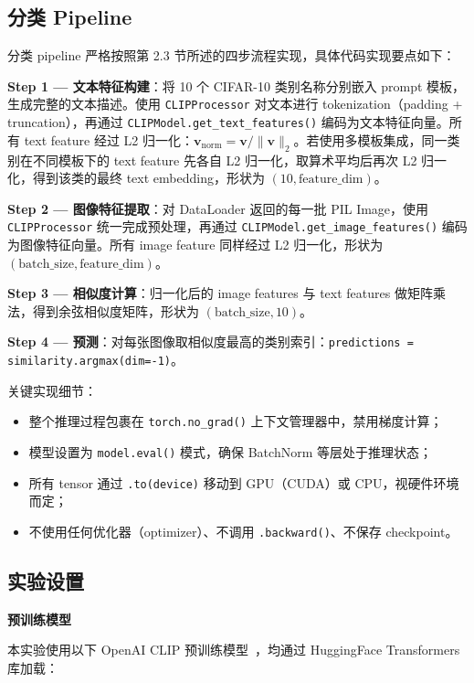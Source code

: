 \documentclass[12pt,a4paper]{ctexart}
\begin{document}
\subsection{分类 Pipeline}

分类 pipeline 严格按照第 2.3 节所述的四步流程实现，具体代码实现要点如下：

\textbf{Step 1 — 文本特征构建}：将 10 个 CIFAR-10 类别名称分别嵌入 prompt 模板，生成完整的文本描述。使用 \texttt{CLIPProcessor} 对文本进行 tokenization（padding + truncation），再通过 \texttt{CLIPModel.get\_text\_features()} 编码为文本特征向量。所有 text feature 经过 L2 归一化：$\mathbf{v}_{\text{norm}} = \mathbf{v} / \|\mathbf{v}\|_2$。若使用多模板集成，同一类别在不同模板下的 text feature 先各自 L2 归一化，取算术平均后再次 L2 归一化，得到该类的最终 text embedding，形状为 $(10, \text{feature\_dim})$。

\textbf{Step 2 — 图像特征提取}：对 DataLoader 返回的每一批 PIL Image，使用 \texttt{CLIPProcessor} 统一完成预处理，再通过 \texttt{CLIPModel.get\_image\_features()} 编码为图像特征向量。所有 image feature 同样经过 L2 归一化，形状为 $(\text{batch\_size}, \text{feature\_dim})$。

\textbf{Step 3 — 相似度计算}：归一化后的 image features 与 text features 做矩阵乘法，得到余弦相似度矩阵，形状为 $(\text{batch\_size}, 10)$。

\textbf{Step 4 — 预测}：对每张图像取相似度最高的类别索引：\texttt{predictions = similarity.argmax(dim=-1)}。

关键实现细节：
\begin{itemize}
    \item 整个推理过程包裹在 \texttt{torch.no\_grad()} 上下文管理器中，禁用梯度计算；
    \item 模型设置为 \texttt{model.eval()} 模式，确保 BatchNorm 等层处于推理状态；
    \item 所有 tensor 通过 \texttt{.to(device)} 移动到 GPU（CUDA）或 CPU，视硬件环境而定；
    \item 不使用任何优化器（optimizer）、不调用 \texttt{.backward()}、不保存 checkpoint。
\end{itemize}

\subsection{实验设置}

\textbf{预训练模型}

本实验使用以下 OpenAI CLIP 预训练模型~\cite{huggingface_clip}，均通过 HuggingFace Transformers 库加载：
\end{document}
